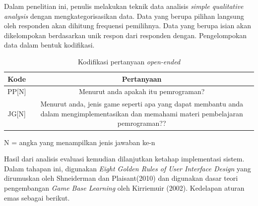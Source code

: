 	Dalam penelitian ini, penulis melakukan teknik data analisis \textit{simple qualitative analysis} dengan mengkategorisasikan data. Data yang berupa pilihan langsung oleh responden akan dihitung frequensi pemilihnya. Data yang berupa isian akan dikelompokan berdasarkan unik respon dari responden dengan. Pengelompokan data dalam bentuk kodifikasi.
	\begin{table}
		\centering
		\caption{Kodifikasi pertanyaan \textit{open-ended}}
		\label{tab:tab1}
		\begin{tabular}{| c | c |}
			\hline
			Kode & Pertanyaan \\
			\hline
			PP[N] & \multicolumn{1}{p{10cm}|}{Menurut anda apakah itu pemrograman?}\\ \hline
			JG[N] & \multicolumn{1}{p{10cm}|}{Menurut anda, jenis game seperti apa yang dapat membantu anda dalam mengimplementasikan dan memahami materi pembelajaran pemrograman??} \\ \hline
		\end{tabular}
		\vspace{1ex}
		
		\raggedright \small{N = angka yang menampilkan jenis jawaban ke-n}
	\end{table}
	Hasil dari analisis evaluasi kemudian dilanjutkan ketahap implementasi sistem. Dalam tahapan ini, digunakan \textit{Eight Golden Rules of User Interface Design} yang dirumuskan oleh Shneiderman dan Plaisant(2010) dan digunakan dasar teori pengembangan \textit{Game Base Learning} oleh Kirriemuir (2002).
	\linebreak\linebreak
	Kedelapan aturan emas sebagai berikut.
	
